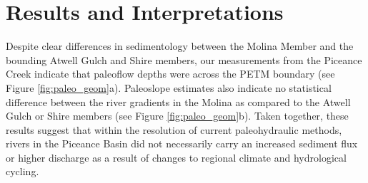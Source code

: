 \documentclass[draft]{compact_proposal}\usepackage[]{graphicx}\usepackage[]{color}
\begin{document}
% 
% 

\section{Results and Interpretations}


Despite clear differences in sedimentology between the Molina Member and the bounding Atwell Gulch and Shire members, our measurements from the Piceance Creek indicate that paleoflow depths were  across the PETM boundary (see Figure \ref{fig:paleo_geom}a).
Paleoslope estimates also indicate no statistical difference between the river gradients in the Molina as compared to the Atwell Gulch or Shire members (see Figure \ref{fig:paleo_geom}b). 
Taken together, these results suggest that within the resolution of current paleohydraulic methods, rivers in the Piceance Basin did not necessarily carry an increased sediment flux or higher discharge as a result of changes to regional climate and hydrological cycling.
\end{document}
